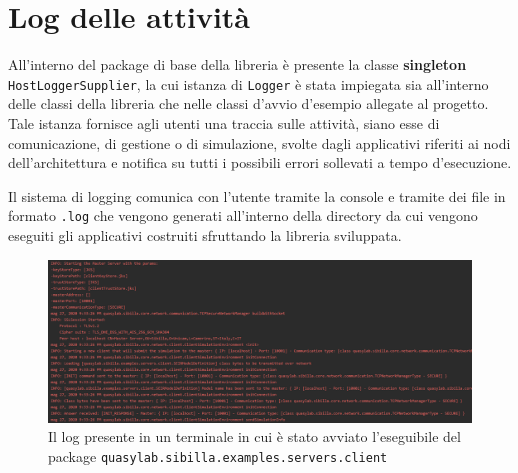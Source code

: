 \section{Log delle attività}
All'interno del package di base della libreria è presente la classe \textbf{singleton} \texttt{HostLoggerSupplier}, la cui istanza di \texttt{Logger} è stata impiegata sia all'interno delle classi della libreria che nelle classi d'avvio d'esempio allegate al progetto.
Tale istanza fornisce agli utenti una traccia sulle attività, siano esse di comunicazione, di gestione o di simulazione, svolte dagli applicativi riferiti ai nodi dell'architettura e notifica su tutti i possibili errori sollevati a tempo d'esecuzione.

Il sistema di logging comunica con l'utente tramite la console e tramite dei file in formato \texttt{.log} che vengono generati all'interno della directory da cui vengono eseguiti gli applicativi costruiti sfruttando la libreria sviluppata.

\begin{figure}[H]
    \includegraphics[width=\linewidth]{images/clientexamplelog.png}
    \captionsetup{justification=centering}
    \caption{Il log presente in un terminale in cui è stato avviato l'eseguibile del package \texttt{quasylab.sibilla.examples.servers.client}}
  \end{figure}